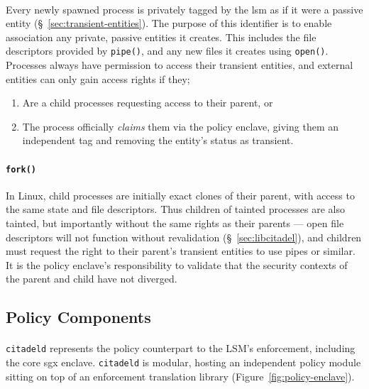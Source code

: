 \paragraph{} Every newly spawned process is privately tagged by the \acrshort{lsm} as if it were a passive entity (§~\ref{sec:transient-entities}). The purpose of this identifier is to enable association any private, passive entities it creates. This includes the file descriptors provided by \texttt{pipe()}, and any new files it creates using \texttt{open()}. Processes always have permission to access their transient entities, and external entities can only gain access rights if they;
\begin{enumerate}
    \item Are a child processes requesting access to their parent, or
    \item The process officially \textit{claims} them via the policy enclave, giving them an independent tag and removing the entity's status as transient. 
\end{enumerate}


\paragraph{\texttt{fork()}} In Linux, child processes are initially exact clones of their parent, with access to the same state and file descriptors. Thus children of tainted processes are also tainted, but importantly without the same rights as their parents --- open file descriptors will not function without revalidation (§~\ref{sec:libcitadel}), and children must request the right to their parent's transient entities to use pipes or similar. It is the policy enclave's responsibility to validate that the security contexts of the parent and child have not diverged. 





\subsection{Policy Components}
\label{sec:policy-enclave}

\paragraph{} \texttt{citadeld} represents the policy counterpart to the LSM's enforcement, including the core \acrshort{sgx} enclave. \texttt{citadeld} is modular, hosting an independent policy module sitting on top of an enforcement translation library (Figure~\ref{fig:policy-enclave}).

